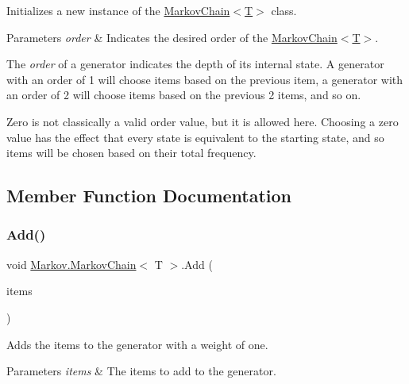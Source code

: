 Initializes a new instance of the \mbox{\hyperlink{class_markov_1_1_markov_chain_a9cb6d5ce158a936323be57ae55622086}{Markov\+Chain$<$\+T$>$}} class. 


\begin{DoxyParams}{Parameters}
{\em order} & Indicates the desired order of the \mbox{\hyperlink{class_markov_1_1_markov_chain_a9cb6d5ce158a936323be57ae55622086}{Markov\+Chain$<$\+T$>$}}.\\
\hline
\end{DoxyParams}


The {\itshape order}  of a generator indicates the depth of its internal state. A generator with an order of 1 will choose items based on the previous item, a generator with an order of 2 will choose items based on the previous 2 items, and so on.

Zero is not classically a valid order value, but it is allowed here. Choosing a zero value has the effect that every state is equivalent to the starting state, and so items will be chosen based on their total frequency.

\subsection{Member Function Documentation}
\mbox{\label{class_markov_1_1_markov_chain_abbdb660ed58d7eed8266dabba4bc29a4}} 
\subsubsection{\texorpdfstring{Add()}{Add()}\hspace{0.1cm}{\footnotesize\ttfamily [1/6]}}
{\footnotesize\ttfamily void \mbox{\hyperlink{class_markov_1_1_markov_chain}{Markov.\+Markov\+Chain}}$<$ T $>$.Add (\begin{DoxyParamCaption}\item[{I\+Enumerable$<$ T $>$}]{items }\end{DoxyParamCaption})}



Adds the items to the generator with a weight of one. 


\begin{DoxyParams}{Parameters}
{\em items} & The items to add to the generator.\\
\hline
\end{DoxyParams}
\mbox{\label{class_markov_1_1_markov_chain_a4c3ca6b8cea20daf5c86cb1f5996c08b}} 
